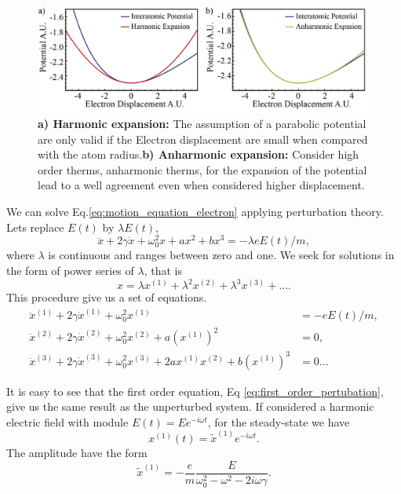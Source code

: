 \begin{figure}[h!]
    \centering
    \includegraphics[width = 16cm]{figuras/Dissertation_interatomic_expassion.jpg}
    \caption{\textbf{a) Harmonic expansion:} The assumption of a parabolic potential are only valid if the Electron displacement are small when compared with the atom radius.\textbf{b) Anharmonic expansion:} Consider high order therms, anharmonic therms, for the expansion of the potential lead to a well agreement even when considered higher displacement.}
    \label{fig:expanssion}
\end{figure}
We can solve Eq.\ref{eq:motion_equation_electron} applying perturbation theory. Lets replace $E(t)$ by $\lambda E(t)$,
\begin{equation}
    \ddot{x} + 2\gamma\dot{x} + \omega_0^2x+ax^2+bx^3 = -\lambda eE(t)/m,
    \label{eq:pertubed_equation_electron}
\end{equation}
where $\lambda$ is continuous and ranges between zero and one. We seek for solutions in the form of power series of $\lambda$, that is 
\begin{equation}
    x = \lambda x^{(1)} + \lambda^2 x^{(2)} + \lambda^3 x^{(3)} +....
    \label{eq:x_pertubation_expanssion}
\end{equation}
This procedure give us a set of equations.
\begin{subequations}
    \begin{align}
        \ddot{x}^{(1)} + 2\gamma\dot{x}^{(1)} + \omega_0^2x^{(1)} &= -eE(t)/m,\label{eq:first_order_pertubation}\\
        \ddot{x}^{(2)} + 2\gamma\dot{x}^{(2)} + \omega_0^2x^{(2)}+a\left(x^{(1)}\right)^2 &= 0,\label{eq:second_order_pertubation}\\
        \ddot{x}^{(3)} + 2\gamma\dot{x}^{(3)} + \omega_0^2x^{(3)}+     2ax^{(1)}x^{(2)} +b\left(x^{(1)}\right)^3 &= 0\label{eq:thirdt_order_pertubation}...    
    \end{align}
\end{subequations}

It is easy to see that the first order equation, Eq \ref{eq:first_order_pertubation}, give us the same result as the unperturbed system. If considered a harmonic electric field with module $E(t) = Ee^{-i\omega t}$, for the steady-state we have
\begin{equation}
    x^{(1)}(t) = \tilde{x}^{(1)}e^{-i\omega t}.
\end{equation}
The amplitude have the form
\begin{equation}
    \tilde{x}^{(1)} = -\frac{e}{m}\frac{E}{\omega_0^2-\omega^2-2i\omega\gamma}.
\end{equation}

